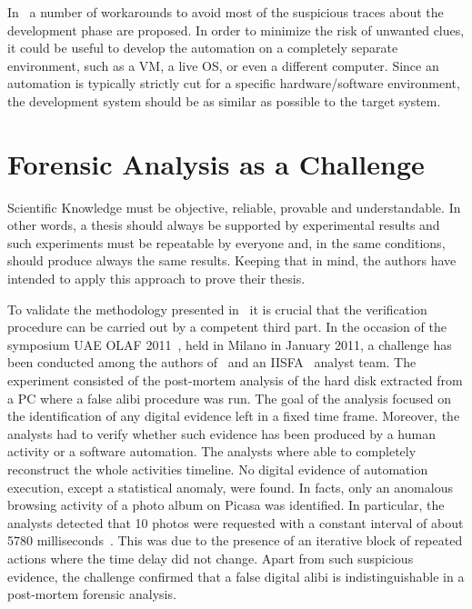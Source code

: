 \documentclass[10pt, conference]{IEEEtran}
\begin{document}
In~\cite{autoalibi} a number of workarounds to avoid most of the suspicious traces about the development phase are proposed. 
In order to minimize the risk of unwanted clues, it could be useful to develop the automation on a completely separate environment,
such as a VM, a live OS, or even a different computer. Since an automation is typically strictly cut for a specific
hardware/software environment, the development system should be as similar as possible to the target system.


\section{Forensic Analysis as a Challenge}
\label{sec:challenge}

Scientific Knowledge must be objective, reliable, provable and understandable. In other words, a thesis
should always be supported by experimental results and such experiments must be repeatable by everyone and, in the same
conditions, should produce always the same results.
Keeping that in mind, the authors have intended to apply this approach to prove their thesis.

To validate the methodology presented in~\cite{autoalibi} it is crucial that the verification procedure can be carried out by a
competent third part. In the occasion of the symposium UAE OLAF 2011~\cite{olaf}, held in Milano in January 2011, a
challenge has been conducted among the authors of~\cite{autoalibi} and an IISFA~\cite{site:iisfa} analyst team. The experiment
consisted of the post-mortem analysis of the hard disk extracted from a PC  where a false alibi procedure was run. The goal of the
analysis focused on the identification of any digital evidence  left in a fixed time frame. Moreover, the analysts had to verify whether
such evidence has been produced by a human activity or a software automation. The analysts where able to completely reconstruct
the whole activities timeline. No digital evidence of automation execution, except a statistical anomaly, were found. In facts, only an
anomalous browsing activity of a photo album on Picasa was identified. In particular, the analysts detected that 10 photos were
requested with a constant interval of about 5780 milliseconds~\cite{slide_alibi_mattia}. This was due to the presence of an iterative
block of repeated actions where the time delay did not change. Apart from such suspicious evidence, the challenge confirmed that
a false digital alibi is indistinguishable in a post-mortem forensic analysis.
\end{document}
